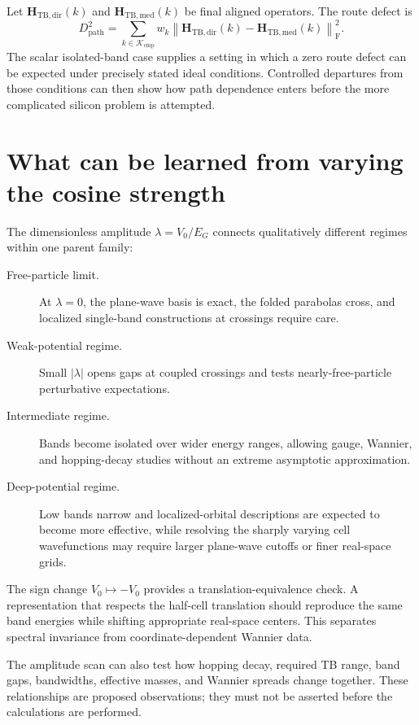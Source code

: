 Let $\mathbf H_{\mathrm{TB,dir}}(k)$ and
$\mathbf H_{\mathrm{TB,med}}(k)$ be final aligned operators. The route defect is
\begin{equation}
    D_{\mathrm{path}}^2
    =
    \sum_{k\in\mathcal K_{\mathrm{cmp}}}
    w_k
    \left\lVert
        \mathbf H_{\mathrm{TB,dir}}(k)
        -
        \mathbf H_{\mathrm{TB,med}}(k)
    \right\rVert_{\mathrm F}^2.
\end{equation}
The scalar isolated-band case supplies a setting in which a zero route defect
can be expected under precisely stated ideal conditions. Controlled departures
from those conditions can then show how path dependence enters before the more
complicated silicon problem is attempted.

\section*{What can be learned from varying the cosine strength}

The dimensionless amplitude $\lambda=V_0/E_G$ connects qualitatively different
regimes within one parent family:
\begin{description}
    \item[Free-particle limit.] At $\lambda=0$, the plane-wave basis is exact,
      the folded parabolas cross, and localized single-band constructions at
      crossings require care.
    \item[Weak-potential regime.] Small $|\lambda|$ opens gaps at coupled
      crossings and tests nearly-free-particle perturbative expectations.
    \item[Intermediate regime.] Bands become isolated over wider energy
      ranges, allowing gauge, Wannier, and hopping-decay studies without an
      extreme asymptotic approximation.
    \item[Deep-potential regime.] Low bands narrow and localized-orbital
      descriptions are expected to become more effective, while resolving the
      sharply varying cell wavefunctions may require larger plane-wave cutoffs
      or finer real-space grids.
\end{description}

The sign change $V_0\mapsto -V_0$ provides a translation-equivalence check. A
representation that respects the half-cell translation should reproduce the
same band energies while shifting appropriate real-space centers. This separates
spectral invariance from coordinate-dependent Wannier data.

The amplitude scan can also test how hopping decay, required TB range, band
gaps, bandwidths, effective masses, and Wannier spreads change together. These
relationships are proposed observations; they must not be asserted before the
calculations are performed.

